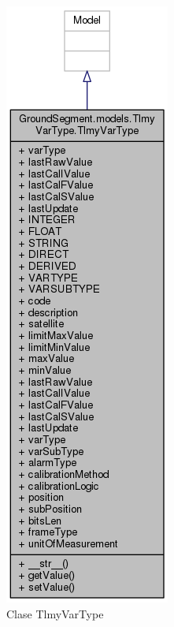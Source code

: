 \documentclass[twoside,twocolumn]{article}
\begin{document}
\begin{figure}[!htb]
    \centering
    \begin{minipage}{0.2\textwidth}
        \centering
        \includegraphics[width=0.5\linewidth]{Imagenes/TelemetryVarType.png}
        \caption{Clase TlmyVarType}
        \label{fig:prob1_6_2}
    \end{minipage}%
    \begin{minipage}{0.2\textwidth}

\end{minipage}
\end{figure}
\end{document}
